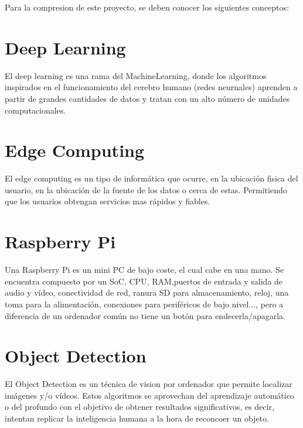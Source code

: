 
Para la compresion de este proyecto, se deben conocer los siguientes conceptos:

\section{Deep Learning} 

El deep learning \cite{deepLearning} es una rama del MachineLearning, donde los algoritmos inspirados en el funcionamiento del cerebro humano (redes neurnales) aprenden a partir de 
grandes cantidades de datos y tratan con un alto número de unidades computacionales.

\section{Edge Computing}

El edge computing \cite{edgeComputing} es un tipo de informática que ocurre, en la ubicación fisica del usuario, en la ubicación de la fuente de los datos o cerca de estas. Permitiendo 
que los usuarios obtengan servicios mas rápidos y fiables.

\section{Raspberry Pi}

Una Raspberry Pi \cite{raspberry} es un mini PC de bajo coste, el cual cabe en una mano. Se encuentra compuesto por un SoC, CPU, RAM,puertos de entrada y salida de audio y vídeo, conectividad de red, 
ranura SD para almacenamiento, reloj, una toma para la alimentación, conexiones para periféricos de bajo nivel..., pero a diferencia de un ordenador común no tiene un botón para endecerla/apagarla.

\section{Object Detection}

El Object Detection \cite{objectDetect} es un técnica de vision por ordenador que permite localizar imágenes y/o vídeos. Estos algoritmos se aprovechan del aprendizaje automático o del profundo 
con el objetivo de obtener resultados significativos, es decir, intentan replicar la inteligencia humana a la hora de reconcoer un objeto.